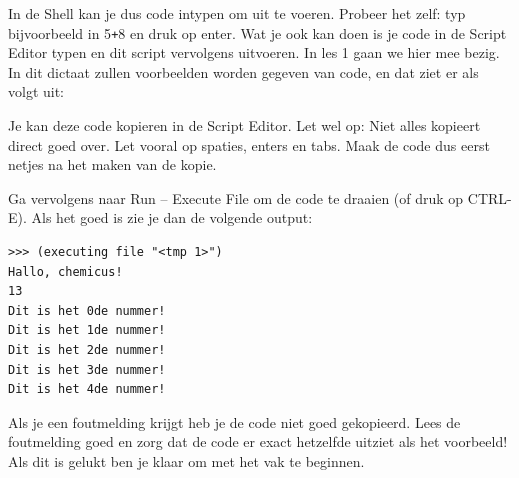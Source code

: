 In de Shell kan je dus code intypen om uit te voeren. Probeer het zelf: typ bijvoorbeeld in 5\texttt{+}8 en druk op enter. Wat je ook kan doen is je code in de Script Editor typen en dit script vervolgens uitvoeren. In les 1 gaan we hier mee bezig. In dit dictaat zullen voorbeelden worden gegeven van code, en dat ziet er als volgt uit:



Je kan deze code kopieren in de Script Editor. Let wel op: Niet alles kopieert direct goed over. Let vooral op spaties, enters en tabs. Maak de code dus eerst netjes na het maken van de kopie.

Ga vervolgens naar Run -- Execute File om de code te draaien (of druk op CTRL-E). Als het goed is zie je dan de volgende output:
\begin{Verbatim}[frame=single]
>>> (executing file "<tmp 1>")
Hallo, chemicus!
13
Dit is het 0de nummer!
Dit is het 1de nummer!
Dit is het 2de nummer!
Dit is het 3de nummer!
Dit is het 4de nummer!
\end{Verbatim}

Als je een foutmelding krijgt heb je de code niet goed gekopieerd. Lees de foutmelding goed en zorg dat de code er exact hetzelfde uitziet als het voorbeeld! Als dit is gelukt ben je klaar om met het vak te beginnen.